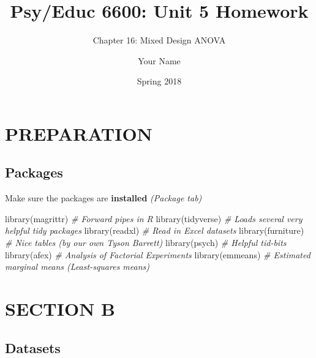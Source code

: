 \documentclass[
]{article}
\title{Psy/Educ 6600: Unit 5 Homework}
\subtitle{Chapter 16: Mixed Design ANOVA}
\author{Your Name}
\date{Spring 2018}
\newenvironment{Shaded}{\begin{snugshade}}{\end{snugshade}}
\newcommand{\CommentTok}[1]{\textcolor[rgb]{0.56,0.35,0.01}{\textit{#1}}}
\newcommand{\FunctionTok}[1]{\textcolor[rgb]{0.00,0.00,0.00}{#1}}
\newcommand{\NormalTok}[1]{#1}
\begin{document}
\maketitle

{
\setcounter{tocdepth}{3}
\tableofcontents
}
\clearpage

\listoftables
\listoffigures

\clearpage

\hypertarget{preparation}{%
\section{PREPARATION}\label{preparation}}

\hypertarget{packages}{%
\subsection{Packages}\label{packages}}

Make sure the packages are \textbf{installed} \emph{(Package tab)}

\begin{Shaded}
\begin{Highlighting}[]
\FunctionTok{library}\NormalTok{(magrittr)     }\CommentTok{\# Forward pipes in R}
\FunctionTok{library}\NormalTok{(tidyverse)    }\CommentTok{\# Loads several very helpful \textquotesingle{}tidy\textquotesingle{} packages}
\FunctionTok{library}\NormalTok{(readxl)       }\CommentTok{\# Read in Excel datasets}
\FunctionTok{library}\NormalTok{(furniture)    }\CommentTok{\# Nice tables (by our own Tyson Barrett)}
\FunctionTok{library}\NormalTok{(psych)        }\CommentTok{\# Helpful tid{-}bits}
\FunctionTok{library}\NormalTok{(afex)         }\CommentTok{\# Analysis of Factorial Experiments}
\FunctionTok{library}\NormalTok{(emmeans)      }\CommentTok{\# Estimated marginal means (Least{-}squares means)}
\end{Highlighting}
\end{Shaded}

\clearpage

\hypertarget{section-b}{%
\section{SECTION B}\label{section-b}}

\hypertarget{datasets}{%
\subsection{Datasets}\label{datasets}}
\end{document}
